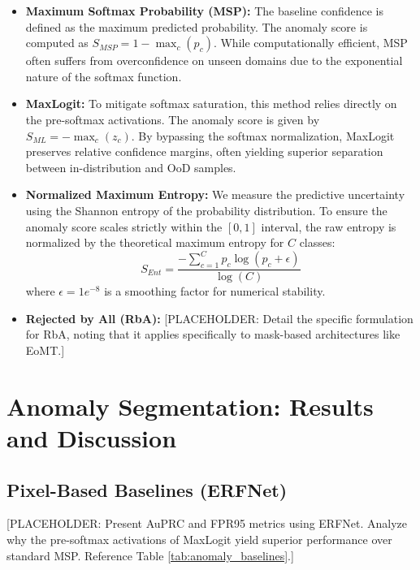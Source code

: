 \documentclass[10pt,conference]{IEEEtran}
\begin{document}
\begin{itemize}
    \item \textbf{Maximum Softmax Probability (MSP):} The baseline confidence is defined as the maximum predicted probability. The anomaly score is computed as $S_{MSP} = 1 - \max_{c} (p_c)$. While computationally efficient, MSP often suffers from overconfidence on unseen domains due to the exponential nature of the softmax function.
    
    \item \textbf{MaxLogit:} To mitigate softmax saturation, this method relies directly on the pre-softmax activations. The anomaly score is given by $S_{ML} = -\max_{c} (z_c)$. By bypassing the softmax normalization, MaxLogit preserves relative confidence margins, often yielding superior separation between in-distribution and OoD samples.
    
    \item \textbf{Normalized Maximum Entropy:} We measure the predictive uncertainty using the Shannon entropy of the probability distribution. To ensure the anomaly score scales strictly within the $[0, 1]$ interval, the raw entropy is normalized by the theoretical maximum entropy for $C$ classes:
    \begin{equation}
        S_{Ent} = \frac{-\sum_{c=1}^{C} p_c \log(p_c + \epsilon)}{\log(C)}
    \end{equation}
    where $\epsilon = 1e^{-8}$ is a smoothing factor for numerical stability.
    
    \item \textbf{Rejected by All (RbA):} [PLACEHOLDER: Detail the specific formulation for RbA, noting that it applies specifically to mask-based architectures like EoMT.]
\end{itemize}

\section{Anomaly Segmentation: Results and Discussion}

\subsection{Pixel-Based Baselines (ERFNet)}
[PLACEHOLDER: Present AuPRC and FPR95 metrics using ERFNet. Analyze why the pre-softmax activations of MaxLogit yield superior performance over standard MSP. Reference Table \ref{tab:anomaly_baselines}.]
\end{document}
